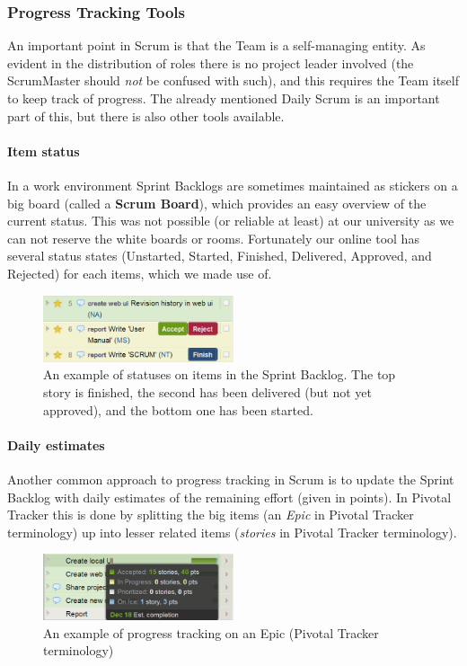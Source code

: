 \subsubsection{Progress Tracking Tools}
An important point in Scrum is that the Team is a self-managing entity. As evident in the distribution of roles there is no project leader involved (the ScrumMaster should \emph{not} be confused with such), and this requires the Team itself to keep track of progress. The already mentioned Daily Scrum is an important part of this, but there is also other tools available.

\paragraph{Item status}
In a work environment Sprint Backlogs are sometimes maintained as stickers on a big board (called a \textbf{Scrum Board}), which provides an easy overview of the current status. This was not possible (or reliable at least) at our university as we can not reserve the white boards or rooms. Fortunately our online tool has several status states (Unstarted, Started, Finished, Delivered, Approved, and Rejected) for each items, which we made use of.
\begin{figure}[htb]
	\centering
	\includegraphics[width=0.50\textwidth]{SCRUM/graphics/status_example.png}
	\caption{An example of statuses on items in the Sprint Backlog. The top story is finished, the second has been delivered (but not yet approved), and the bottom one has been started.}
	\label{fig:itemstatus}
\end{figure}

\paragraph{Daily estimates}
Another common approach to progress tracking in Scrum is to update the Sprint Backlog with daily estimates of the remaining effort (given in points). In Pivotal Tracker this is done by splitting the big items (an \textit{Epic} in Pivotal Tracker terminology) up into lesser related items (\textit{stories} in Pivotal Tracker terminology).
\begin{figure}[htb]
	\centering
	\includegraphics[width=0.50\textwidth]{SCRUM/graphics/epic_example.png}
	\caption{An example of progress tracking on an Epic (Pivotal Tracker terminology)}
	\label{fig:epicexample}
\end{figure}

